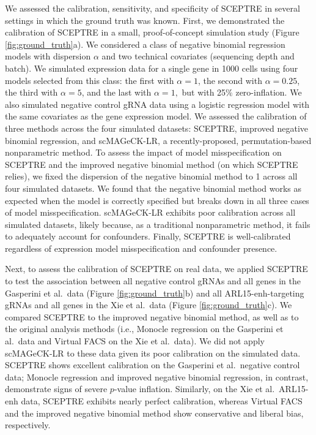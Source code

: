 \documentclass{nature}
\begin{document}
We assessed the calibration, sensitivity, and specificity of SCEPTRE in several settings in which the ground truth was known. First, we demonstrated the calibration of SCEPTRE in a small, proof-of-concept simulation study (Figure \ref{fig:ground_truth}a). We considered a class of negative binomial regression models with dispersion $\alpha$ and two technical covariates (sequencing depth and batch). We simulated expression data for a single gene in 1000 cells using four models selected from this class: the first with $\alpha = 1$, the second with $\alpha = 0.25$, the third with $\alpha = 5$, and the last with $\alpha = 1,$ but with 25$\%$ zero-inflation. We also simulated negative control gRNA data using a logistic regression model with the same covariates as the gene expression model. We assessed the calibration of three methods across the four simulated datasets: SCEPTRE, improved negative binomial regression, and scMAGeCK-LR,\cite{Yang2020} a recently-proposed, permutation-based nonparametric method. To assess the impact of model misspecification on SCEPTRE and the improved negative binomial method (on which SCEPTRE relies), we fixed the dispersion of the negative binomial method to 1 across all four simulated datasets. We found that the negative binomial method works as expected when the model is correctly specified but breaks down in all three cases of model misspecification. scMAGeCK-LR exhibits poor calibration across all simulated datasets, likely because, as a traditional nonparametric method, it fails to adequately account for confounders. Finally, SCEPTRE is well-calibrated regardless of expression model misspecification and confounder presence.

Next, to assess the calibration of SCEPTRE on real data, we applied SCEPTRE to test the association between all negative control gRNAs and all genes in the Gasperini et al.\ data (Figure \ref{fig:ground_truth}b) and all ARL15-enh-targeting gRNAs and all genes in the Xie et al.\ data (Figure \ref{fig:ground_truth}c). We compared SCEPTRE to the improved negative binomial method, as well as to the original analysis methods (i.e., Monocle regression on the Gasperini et al.\ data and Virtual FACS on the Xie et al.\ data). We did not apply scMAGeCK-LR to these data given its poor calibration on the simulated data. SCEPTRE shows excellent calibration on the Gasperini et al.\ negative control data; Monocle regression and improved negative binomial regression, in contrast, demonstrate signs of severe $p$-value inflation. Similarly, on the Xie et al.\ ARL15-enh data, SCEPTRE exhibits nearly perfect calibration, whereas Virtual FACS and the improved negative binomial method show conservative and liberal bias, respectively.
\end{document}
